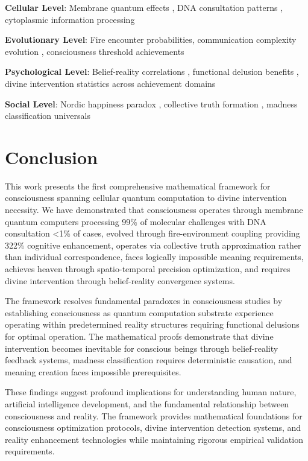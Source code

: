 \documentclass[12pt,a4paper]{article}
\begin{document}
\textbf{Cellular Level}: Membrane quantum effects \citep{engel2007evidence}, DNA consultation patterns \citep{consortium2012integrated}, cytoplasmic information processing \citep{albright2018quantum}

\textbf{Evolutionary Level}: Fire encounter probabilities, communication complexity evolution \citep{dunbar1996grooming}, consciousness threshold achievements \citep{wrangham2009catching}

\textbf{Psychological Level}: Belief-reality correlations \citep{bandura1977social}, functional delusion benefits \citep{taylor1988illusion}, divine intervention statistics across achievement domains

\textbf{Social Level}: Nordic happiness paradox \citep{helliwell2021world}, collective truth formation \citep{mercier2017enigma}, madness classification universals \citep{kleinman1991rethinking}

\section{Conclusion}

This work presents the first comprehensive mathematical framework for consciousness spanning cellular quantum computation to divine intervention necessity. We have demonstrated that consciousness operates through membrane quantum computers processing 99\% of molecular challenges with DNA consultation <1\% of cases, evolved through fire-environment coupling providing 322\% cognitive enhancement, operates via collective truth approximation rather than individual correspondence, faces logically impossible meaning requirements, achieves heaven through spatio-temporal precision optimization, and requires divine intervention through belief-reality convergence systems.

The framework resolves fundamental paradoxes in consciousness studies by establishing consciousness as quantum computation substrate experience operating within predetermined reality structures requiring functional delusions for optimal operation. The mathematical proofs demonstrate that divine intervention becomes inevitable for conscious beings through belief-reality feedback systems, madness classification requires deterministic causation, and meaning creation faces impossible prerequisites.

These findings suggest profound implications for understanding human nature, artificial intelligence development, and the fundamental relationship between consciousness and reality. The framework provides mathematical foundations for consciousness optimization protocols, divine intervention detection systems, and reality enhancement technologies while maintaining rigorous empirical validation requirements.
\end{document}
